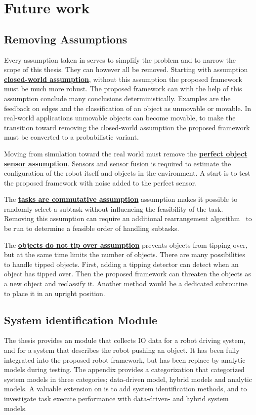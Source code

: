 \chapter{Future work}%
\label{chap:future_work}

\section*{Removing Assumptions}
Every assumption taken in  serves to simplify the problem and to narrow the scope of this thesis. They can however all be removed. Starting with assumption \hyperref[assumption:closed_world]{\textbf{closed-world assumption}}, without this assumption the proposed framework must be much more robust. The proposed framework can with the help of this assumption conclude many conclusions deterministically. Examples are the feedback on edges and the classification of an object as unmovable or movable. In real-world applications unmovable objects can become movable, to make the transition toward removing the closed-world assumption the proposed framework must be converted to a probabilistic variant.\bs

Moving from simulation toward the real world must remove the \hyperref[assumption:perfect_object_sensor]{\textbf{perfect object sensor assumption}}. Sensors and sensor fusion is required to estimate the configuration of the robot itself and objects in the environment. A start is to test the proposed framework with noise added to the perfect sensor.\bs

The \hyperref[assumption:order_does_not_matter]{\textbf{tasks are commutative assumption}} assumption makes it possible to randomly select a subtask without influencing the feasibility of the task. Removing this assumption can require an additional rearrangement algorithm~\cite{krontiris_dealing_2015} to be run to determine a feasible order of handling subtasks.\bs

The \hyperref[assumption:no_tipping]{\textbf{objects do not tip over assumption}} prevents objects from tipping over, but at the same time limits the number of objects. There are many possibilities to handle tipped objects. First, adding a tipping detector can detect when an object has tipped over. Then the proposed framework can threaten the objects as a new object and reclassify it. Another method would be a dedicated subroutine to place it in an upright position.\bs

\section*{System identification Module}
The thesis provides an module that collects \ac{IO} data for a robot driving system, and for a system that describes the robot pushing an object. It has been fully integrated into the proposed robot framework, but has been replace by analytic models during testing. The appendix provides a categorization that categorized system models in three categories; data-driven model, hybrid models and analytic models. A valuable extension on is to add system identification methods, and to investigate task execute performance with data-driven- and hybrid system models.\bs

